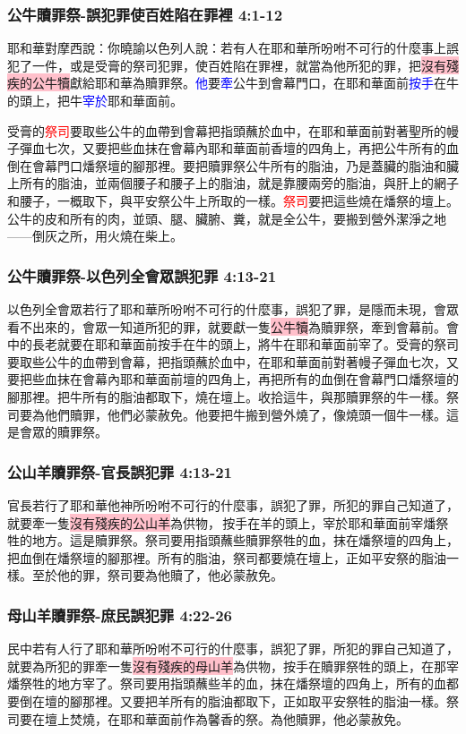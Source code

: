 \subsubsection{公牛贖罪祭-誤犯罪使百姓陷在罪裡 4:1-12}
耶和華對摩西說：你曉諭以色列人說：若有人在耶和華所吩咐不可行的什麼事上誤犯了一件，或是受膏的祭司犯罪，使百姓陷在罪裡，就當為他所犯的罪，把\colorbox{pink}{沒有殘疾的公牛犢}獻給耶和華為贖罪祭。\textcolor{blue}{他}要\textcolor{blue}{牽}公牛到會幕門口，在耶和華面前\textcolor{blue}{按手}在牛的頭上，把牛\textcolor{blue}{宰於}耶和華面前。

\newpage
受膏的\textcolor{red}{祭司}要取些公牛的血帶到會幕把指頭蘸於血中，在耶和華面前對著聖所的幔子彈血七次，又要把些血抹在會幕內耶和華面前香壇的四角上，再把公牛所有的血倒在會幕門口燔祭壇的腳那裡。要把贖罪祭公牛所有的脂油，乃是蓋臟的脂油和臟上所有的脂油，並兩個腰子和腰子上的脂油，就是靠腰兩旁的脂油，與肝上的網子和腰子，一概取下，與平安祭公牛上所取的一樣。\textcolor{red}{祭司}要把這些燒在燔祭的壇上。公牛的皮和所有的肉，並頭、腿、臟腑、糞，就是全公牛，要搬到營外潔淨之地——倒灰之所，用火燒在柴上。

\subsubsection{公牛贖罪祭-以色列全會眾誤犯罪 4:13-21}
以色列全會眾若行了耶和華所吩咐不可行的什麼事，誤犯了罪，是隱而未現，會眾看不出來的，會眾一知道所犯的罪，就要獻一隻\colorbox{pink}{公牛犢}為贖罪祭，牽到會幕前。會中的長老就要在耶和華面前按手在牛的頭上，將牛在耶和華面前宰了。受膏的祭司要取些公牛的血帶到會幕，把指頭蘸於血中，在耶和華面前對著幔子彈血七次，又要把些血抹在會幕內耶和華面前壇的四角上，再把所有的血倒在會幕門口燔祭壇的腳那裡。把牛所有的脂油都取下，燒在壇上。收拾這牛，與那贖罪祭的牛一樣。祭司要為他們贖罪，他們必蒙赦免。他要把牛搬到營外燒了，像燒頭一個牛一樣。這是會眾的贖罪祭。

\subsubsection{公山羊贖罪祭-官長誤犯罪 4:13-21}
官長若行了耶和華他神所吩咐不可行的什麼事，誤犯了罪，所犯的罪自己知道了，就要牽一隻\colorbox{pink}{沒有殘疾的公山羊}為供物， 按手在羊的頭上，宰於耶和華面前宰燔祭牲的地方。這是贖罪祭。祭司要用指頭蘸些贖罪祭牲的血，抹在燔祭壇的四角上，把血倒在燔祭壇的腳那裡。所有的脂油，祭司都要燒在壇上，正如平安祭的脂油一樣。至於他的罪，祭司要為他贖了，他必蒙赦免。

\subsubsection{母山羊贖罪祭-庶民誤犯罪 4:22-26}
民中若有人行了耶和華所吩咐不可行的什麼事，誤犯了罪，所犯的罪自己知道了，就要為所犯的罪牽一隻\colorbox{pink}{沒有殘疾的母山羊}為供物，按手在贖罪祭牲的頭上，在那宰燔祭牲的地方宰了。祭司要用指頭蘸些羊的血，抹在燔祭壇的四角上，所有的血都要倒在壇的腳那裡。又要把羊所有的脂油都取下，正如取平安祭牲的脂油一樣。祭司要在壇上焚燒，在耶和華面前作為馨香的祭。為他贖罪，他必蒙赦免。

